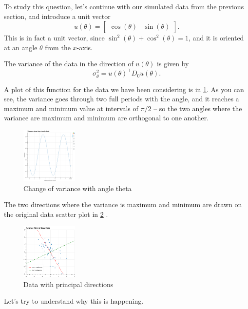 \documentclass[
]{article}
\begin{document}
To study this question, let's continue with our simulated data from the
previous section, and introduce a unit vector \[
u(\theta) = \left[\begin{matrix} \cos(\theta) & \sin(\theta)\end{matrix}\right].
\] This is in fact a unit vector, since
\(\sin^2(\theta)+\cos^2(\theta)=1\), and it is oriented at an angle
\(\theta\) from the \(x\)-axis.

The variance of the data in the direction of \(u(\theta)\) is given by
\[
\sigma_{\theta}^2 = u(\theta)^{\intercal}D_{0}u(\theta).
\]

A plot of this function for the data we have been considering is in
\cref{fig:pcatheta}. As you can see, the variance goes through two full
periods with the angle, and it reaches a maximum and minimum value at
intervals of \(\pi/2\) -- so the two angles where the variance are
maximum and minimum are orthogonal to one another.

\begin{figure}
\hypertarget{fig:pcatheta}{%
\centering
\includegraphics[width=0.25\textwidth,height=\textheight]{../img/PCAtheta.png}
\caption{Change of variance with angle theta}\label{fig:pcatheta}
}
\end{figure}

The two directions where the variance is maximum and minimum are drawn
on the original data scatter plot in \cref{fig:pcaprincipal} .

\begin{figure}
\hypertarget{fig:pcaprincipal}{%
\centering
\includegraphics[width=0.25\textwidth,height=\textheight]{../img/PCAprincipal.png}
\caption{Data with principal directions}\label{fig:pcaprincipal}
}
\end{figure}

Let's try to understand why this is happening.
\end{document}
